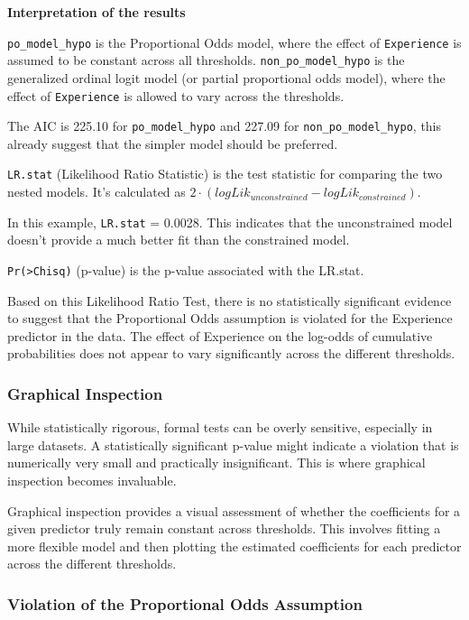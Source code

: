 \documentclass[
  letterpaper,
  DIV=11,
  numbers=noendperiod]{scrartcl}
\begin{document}
\textbf{Interpretation of the results}

\texttt{po\_model\_hypo} is the Proportional Odds model, where the
effect of \texttt{Experience} is assumed to be constant across all
thresholds. \texttt{non\_po\_model\_hypo} is the generalized ordinal
logit model (or partial proportional odds model), where the effect of
\texttt{Experience} is allowed to vary across the thresholds.

The AIC is 225.10 for \texttt{po\_model\_hypo} and 227.09 for
\texttt{non\_po\_model\_hypo}, this already suggest that the simpler
model should be preferred.

\texttt{LR.stat} (Likelihood Ratio Statistic) is the test statistic for
comparing the two nested models. It's calculated as
\(2 \cdot (logLik_{unconstrained} −logLik_{constrained})\).

In this example, \texttt{LR.stat} = 0.0028. This indicates that the
unconstrained model doesn't provide a much better fit than the
constrained model.

\texttt{Pr(\textgreater{}Chisq)} (p-value) is the p-value associated
with the LR.stat.

Based on this Likelihood Ratio Test, there is no statistically
significant evidence to suggest that the Proportional Odds assumption is
violated for the Experience predictor in the data. The effect of
Experience on the log-odds of cumulative probabilities does not appear
to vary significantly across the different thresholds.

\hypertarget{graphical-inspection}{%
\subsubsection*{Graphical Inspection}\label{graphical-inspection}}

While statistically rigorous, formal tests can be overly sensitive,
especially in large datasets. A statistically significant p-value might
indicate a violation that is numerically very small and practically
insignificant. This is where graphical inspection becomes invaluable.

Graphical inspection provides a visual assessment of whether the
coefficients for a given predictor truly remain constant across
thresholds. This involves fitting a more flexible model and then
plotting the estimated coefficients for each predictor across the
different thresholds.

\hypertarget{violation-of-the-proportional-odds-assumption}{%
\subsubsection*{Violation of the Proportional Odds
Assumption}\label{violation-of-the-proportional-odds-assumption}}
\end{document}

